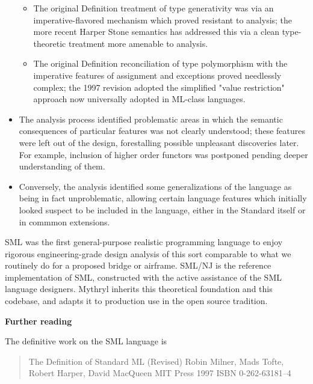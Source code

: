 \begin{itemize}
\begin{itemize}
    \item The original Definition treatment of type generativity was via an imperative-flavored 
          mechanism which proved resistant to analysis;  the more recent Harper Stone semantics 
          has addressed this via a clean type-theoretic treatment more amenable to analysis. 

    \item The original Definition reconciliation of type polymorphism with the imperative features 
          of assignment and exceptions proved needlessly complex;  the 1997 revision adopted the 
          simplified "value restriction" approach now universally adopted in ML-class languages. 
    \end{itemize}      

\item The analysis process identified problematic areas in which the semantic consequences 
      of particular features was not clearly understood;  these features were left out of 
      the design, forestalling possible unpleasant discoveries later.  For example, inclusion 
      of higher order functors was postponed pending deeper understanding of them. 

\item Conversely, the analysis identified some generalizations of the language as being 
      in fact unproblematic, allowing certain language features which initially looked suspect 
      to be included in the language, either in the Standard itself or in commmon extensions.  
\end{itemize}

SML was the first general-purpose realistic programming language to 
enjoy rigorous engineering-grade design analysis of this sort 
comparable to what we routinely do for a proposed bridge or 
airframe. SML/NJ is the reference implementation of SML, constructed 
with the active assistance of the SML language designers.  Mythryl 
inherits this theoretical foundation and this codebase, and adapts it 
to production use in the open source tradition. 



{\bf Further reading} 

The definitive work on the SML language is\newline 
\begin{quotation} 
The Definition of Standard ML (Revised)\newline 
Robin Milner, Mads Tofte, Robert Harper, David MacQueen\newline 
MIT Press 1997 ISBN 0-262-63181--4\newline 
\end{quotation}


